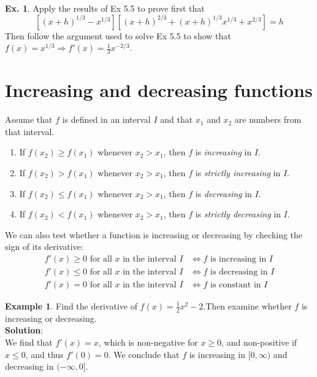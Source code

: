 \documentclass[10pt,a4paper]{book}
\theoremstyle{definition}\newtheorem{definition}{Definition}
\theoremstyle{definition}\newtheorem{fact}{Fact}
\theoremstyle{definition}\newtheorem{ex}{Ex.}
\theoremstyle{definition}\newtheorem{project}{Project}
\theoremstyle{definition}\newtheorem{problem}{Problem}
\theoremstyle{definition}\newtheorem{example}{Example}
\numberwithin{theorem}{chapter}
\numberwithin{corollary}{chapter}
\numberwithin{assumption}{chapter}
\numberwithin{definition}{chapter}
\numberwithin{prop}{chapter}
\numberwithin{notation}{chapter}
\numberwithin{problem}{chapter}
\numberwithin{example}{chapter}
\numberwithin{fact}{chapter}
\numberwithin{ex}{chapter}
\begin{document}
	\begin{ex}
		Apply the results of Ex 5.5 to prove first that
		$$[(x+h)^{1/3} - x^{1/3}][(x+h)^{2/3} +(x+h)^{1/3}x^{1/3} +x^{2/3}]=h
		$$
		Then follow the argument used to solve Ex 5.5 to show that $f (x) = x^{1/3} \Rightarrow  f' (x) = \frac{1}{3}x^{-2/3} $.
	\end{ex}
	
	\section{Increasing and decreasing functions}
	Assume that $f$ is defined in an interval $I$ and that $x_1$ and $x_2$ are numbers from that interval.
	\begin{enumerate}[label=(\roman*)]
		\item If $f (x_2) \geq f (x_1)$ whenever $x_2 > x_1$, then $f$ is \textit{increasing} in $I$.
		\item If $f (x_2) > f (x_1)$ whenever $x_2 > x_1$, then $f$ is \textit{strictly increasing} in $I$.
		\item If $f (x_2) \leq f (x_1)$ whenever $x_2 > x_1$, then $f$ is \textit{decreasing} in $I$.
		\item If $f (x_2) < f (x_1)$ whenever $x_2 > x_1$, then $f$ is \textit{strictly decreasing} in $I$.
	\end{enumerate}
	
	We can also test whether a function is increasing or decreasing by checking the sign of its derivative:
	\begin{align*}
		f'(x) \geq 0 \text{ for all } x \text{ in the interval } I & \Leftrightarrow f \text{ is increasing in } I \\
		f'(x) \leq 0 \text{ for all } x \text{ in the interval } I & \Leftrightarrow f \text{ is decreasing in } I \\
		f'(x) = 0 \text{ for all } x \text{ in the interval } I    & \Leftrightarrow f \text{ is constant in } I   
	\end{align*}
	
	\begin{example}
		Find the derivative of $f(x)= \frac{1}{2}x^2 -2$.Then examine whether $f$ is increasing or decreasing.
		\\
		\textbf{Solution}:
		\\
		We find that $f'(x) = x$, which is non-negative for $x \geq 0$, and non-positive if $x \leq 0$, and thus $f'(0) = 0$. We conclude that $f$ is increasing in $[0, \infty)$ and decreasing in $(-\infty, 0]$.
	\end{example}
	
\end{document}
